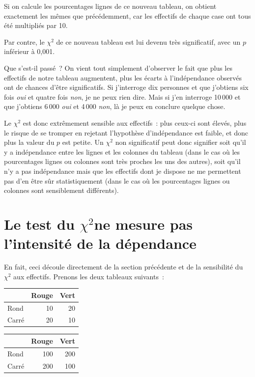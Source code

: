 \documentclass[a4paper,10pt,twoside,francais]{report}
\newcommand{\chid}{$\chi^2$\xspace}
\newcommand{\chidpdf}{\texorpdfstring{$\chi^2$\xspace}{X\texttwosuperior\xspace}}
\begin{document}
Si on calcule les pourcentages lignes de ce nouveau tableau, on
obtient exactement les mêmes que précédemment, car les effectifs de
chaque case ont tous été multipliés par 10.

Par contre, le \chid de ce nouveau tableau est lui devenu très
significatif, avec un $p$ inférieur à 0,001.

Que s'est-il passé~? On vient tout simplement d'observer le fait que
plus les effectifs de notre tableau augmentent, plus les écarts à
l'indépendance observés ont de chances d'être significatifs. Si
j'interroge dix personnes et que j'obtiens six fois \textit{oui} et
quatre fois \textit{non}, je ne peux rien dire. Mais si j'en interroge
10\,000 et que j'obtiens 6\,000 \textit{oui} et 4\,000 \textit{non},
là je peux en conclure quelque chose.

Le \chid est donc extrêmement sensible aux effectifs~: plus ceux-ci
sont élevés, plus le risque de se tromper en rejetant l'hypothèse
d'indépendance est faible, et donc plus la valeur du $p$ est
petite. Un \chid non significatif peut donc signifier soit qu'il y a
indépendance entre les lignes et les colonnes du tableau (dans le cas
où les pourcentages lignes ou colonnes sont très proches les uns des
autres), soit qu'il n'y a pas indépendance mais que les effectifs dont
je dispose ne me permettent pas d'en être sûr statistiquement (dans le
cas où les pourcentages lignes ou colonnes sont sensiblement
différents).


\section{Le test du \chidpdf ne mesure pas l'intensité de la dépendance}
\label{sec-intdep}

En fait, ceci découle directement de la section précédente et de la
sensibilité du \chid aux effectifs. Prenons les deux tableaux
suivants~:

\begin{center}
  \hfill
  \begin{minipage}[c]{.46\linewidth}
    \begin{tabular}[!h]{lrr}
      \toprule
      & Rouge & Vert \\
      \midrule
       Rond & 10 & 20 \\
       Carré & 20 & 10 \\
      \bottomrule
    \end{tabular}
  \end{minipage} 
  \hfill
  \begin{minipage}[c]{.46\linewidth}
    \begin{tabular}[!h]{lrr}
      \toprule
      & Rouge & Vert \\
      \midrule
      Rond & 100 & 200 \\
      Carré &  200 & 100 \\
      \bottomrule
    \end{tabular}
  \end{minipage}
  \hfill
\end{center}
\end{document}
